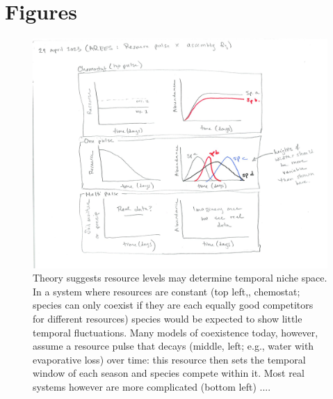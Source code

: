 \documentclass[11pt]{article}
\begin{document}
\section{Figures}
\begin{figure}[h!]
\centering
\includegraphics[width=1\textwidth]{..//figures/FigResourceApr2023.png}
\caption{Theory suggests resource levels may determine temporal niche space. In a system where resources are constant (top left,, chemostat; species can only coexist if they are each equally good competitors for different resources) species would be expected to show little temporal fluctuations. Many models of coexistence today, however, assume a resource pulse that decays (middle, left; e.g., water with evaporative loss) over time: this resource then sets the temporal window of each season and species compete within it. Most real systems however are more complicated (bottom left) ....}
 \label{fig:resource}
\end{figure}
\end{document}
